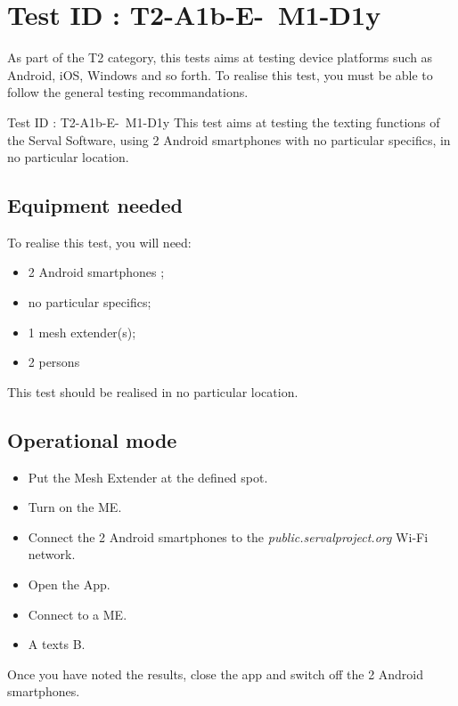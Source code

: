 \documentclass[oneside]{book}
\begin{document}
\section{Test ID : T2-A1b-E- M1-D1y}
\begin{itshape}
As part of the T2 category, this tests aims at testing device platforms such as Android, iOS, Windows and so forth.
To realise this test, you must be able to follow the general testing recommandations.
\end{itshape}
\newline
Test ID : T2-A1b-E- M1-D1y
 This test aims at testing the texting functions of the Serval Software, using 2 Android smartphones with no particular specifics, in no particular location.
\subsection{Equipment needed} To realise this test, you will need:
\begin{itemize}
\item 2 Android smartphones ;
\item no particular specifics;
\item 1 mesh extender(s);
\item 2 persons
\end{itemize}
This test should be realised in no particular location.
\subsection{Operational mode} \begin{itemize}
\item Put the Mesh Extender at the defined spot.
\item Turn on the ME.
\item Connect the 2 Android smartphones to the \emph{public.servalproject.org} Wi-Fi network.
\item Open the App.
\item Connect to a ME.
\item A texts B.
\end{itemize}
Once you have noted the results, close the app and switch off the 2 Android smartphones.
\end{document}
